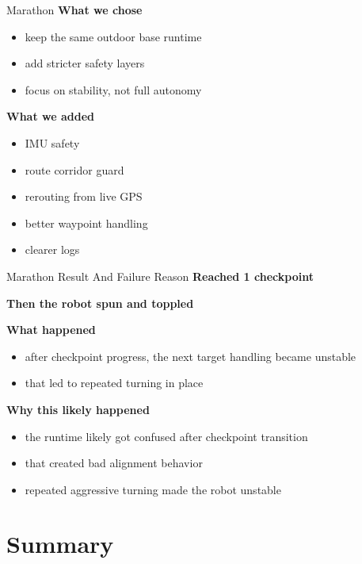 \documentclass{beamer}
\begin{document}
\begin{frame}{Marathon}
\textbf{What we chose}
\begin{itemize}
  \item keep the same outdoor base runtime
  \item add stricter safety layers
  \item focus on stability, not full autonomy
\end{itemize}

\vspace{0.5em}
\textbf{What we added}
\begin{itemize}
  \item IMU safety
  \item route corridor guard
  \item rerouting from live GPS
  \item better waypoint handling
  \item clearer logs
\end{itemize}
\end{frame}

\begin{frame}{Marathon Result And Failure Reason}
\Large
\centering
\textbf{Reached 1 checkpoint}

\vspace{0.8em}
\textbf{Then the robot spun and toppled}

\normalsize
\vspace{1.0em}
\raggedright
\textbf{What happened}
\begin{itemize}
  \item after checkpoint progress, the next target handling became unstable
  \item that led to repeated turning in place
\end{itemize}

\vspace{0.5em}
\textbf{Why this likely happened}
\begin{itemize}
  \item the runtime likely got confused after checkpoint transition
  \item that created bad alignment behavior
  \item repeated aggressive turning made the robot unstable
\end{itemize}
\end{frame}

\section{Summary}
\end{document}
